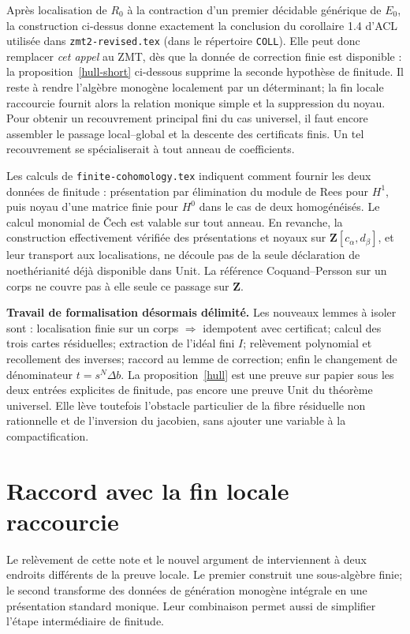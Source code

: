 \documentclass[11pt]{amsart}
\begin{document}
Après localisation de $R_0$ à la contraction d'un premier décidable
générique de $E_0$, la construction ci-dessus donne exactement la
conclusion du corollaire 1.4 d'ACL utilisée dans
\texttt{zmt2-revised.tex} (dans le répertoire \texttt{COLL}).
Elle peut donc remplacer \emph{cet appel} au ZMT, dès que la donnée
de correction finie est disponible : la proposition~\ref{hull-short}
ci-dessous supprime la seconde hypothèse de finitude.
Il reste à rendre l'algèbre monogène localement par un déterminant;
la fin locale raccourcie fournit alors la relation monique simple et
la suppression du noyau. Pour obtenir un recouvrement principal fini
du cas universel, il faut encore assembler le passage local--global
et la descente des certificats finis. Un tel recouvrement se
spécialiserait à tout anneau de coefficients.

Les calculs de \texttt{finite-cohomology.tex} indiquent comment fournir
les deux données de finitude : présentation par élimination du module
de Rees pour $H^1$, puis noyau d'une matrice finie pour $H^0$ dans le
cas de deux homogénéisés. Le calcul monomial de Čech est valable
sur tout anneau. En revanche, la construction effectivement vérifiée
des présentations et noyaux sur $\mathbf Z[c_\alpha,d_\beta]$, et leur
transport aux localisations, ne découle pas de la seule déclaration
de noethérianité déjà disponible dans Unit. La référence
Coquand--Persson sur un corps ne couvre pas à elle seule ce passage
sur $\mathbf Z$.

\medskip
\noindent\textbf{Travail de formalisation désormais délimité.}
Les nouveaux lemmes à isoler sont : localisation finie sur un corps
$\Rightarrow$ idempotent avec certificat; calcul des trois cartes
résiduelles; extraction de l'idéal fini $I$; relèvement polynomial et
recollement des inverses; raccord au lemme de correction; enfin le
changement de dénominateur $t=s^N\Delta b$.
La proposition~\ref{hull} est une preuve sur papier sous les deux
entrées explicites de finitude, pas encore une preuve Unit du théorème
universel. Elle lève toutefois l'obstacle particulier de la fibre
résiduelle non rationnelle et de l'inversion du jacobien, sans ajouter
une variable à la compactification.

\section{Raccord avec la fin locale raccourcie}

Le relèvement de cette note et le nouvel argument de
 interviennent à deux endroits
différents de la preuve locale. Le premier construit une sous-algèbre
finie; le second transforme des données de génération monogène
intégrale en une présentation standard monique. Leur combinaison
permet aussi de simplifier l'étape intermédiaire de finitude.
\end{document}
